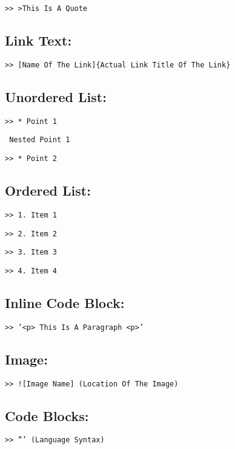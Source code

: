 \documentclass[12pt,british]{article}
\begin{document}
\noindent \texttt{>\textcompwordmark > >This Is A Quote}

\subsection{Link Text:}

\noindent \texttt{>\textcompwordmark > {[}Name Of The Link{]}\{Actual
Link \textquotedbl Title Of The Link\textquotedbl\}}

\subsection{Unordered List:}

\noindent \texttt{>\textcompwordmark > {*} Point 1}

\noindent \texttt{\qquad{}\qquad{}\qquad{}{*} Nested Point 1}

\noindent \texttt{>\textcompwordmark > {*} Point 2}

\subsection{Ordered List:}

\noindent \texttt{>\textcompwordmark > 1. Item 1}

\noindent \texttt{>\textcompwordmark > 2. Item 2}

\noindent \texttt{>\textcompwordmark > 3. Item 3}

\noindent \texttt{>\textcompwordmark > 4. Item 4}

\subsection{Inline Code Block:}

\noindent \texttt{>\textcompwordmark > '<p> This Is A Paragraph <p>'}

\subsection{Image:}

\noindent \texttt{>\textcompwordmark > !{[}Image Name{]} (Location
Of The Image)}

\subsection{Code Blocks:}

\noindent \texttt{>\textcompwordmark > \texttt{\:}''' (Language
	Syntax)}
\end{document}
